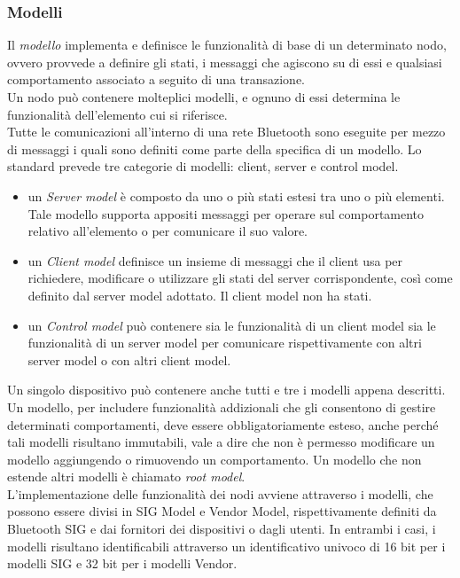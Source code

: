 \subsubsection{Modelli}
\label{subsub:modelli}
Il \textit{modello} implementa e definisce le funzionalità di base di un determinato nodo, ovvero provvede a definire gli stati, i messaggi che agiscono su di essi e qualsiasi comportamento associato a seguito di una transazione.\\
Un nodo può contenere molteplici modelli, e ognuno di essi determina le funzionalità dell'elemento cui si riferisce.\\
Tutte le comunicazioni all'interno di una rete Bluetooth sono eseguite per mezzo di messaggi i quali sono definiti come parte della specifica di un modello. Lo standard prevede tre categorie di modelli: client, server e control model.

\begin{itemize}
    \item un \textit{Server model} è composto da uno o più stati estesi tra uno o più elementi. Tale modello supporta appositi messaggi per operare sul comportamento relativo all'elemento o per comunicare il suo valore.
    
    \item un \textit{Client model} definisce un insieme di messaggi che il client usa per richiedere, modificare o utilizzare gli stati del server corrispondente, così come definito dal server model adottato. Il client model non ha stati.
    
    \item un \textit{Control model} può contenere sia le funzionalità di un client model sia le funzionalità di un server model per comunicare rispettivamente con altri server model o con altri client model.
\end{itemize}
Un singolo dispositivo può contenere anche tutti e tre i modelli appena descritti. 
Un modello, per includere funzionalità addizionali che gli consentono di gestire determinati comportamenti, deve essere obbligatoriamente esteso, anche perché tali modelli risultano immutabili, vale a dire che non è permesso modificare un modello aggiungendo o rimuovendo un comportamento.
Un modello che non estende altri modelli è chiamato \textit{root model}.\\
L'implementazione delle funzionalità dei nodi avviene attraverso i modelli, che possono essere divisi in SIG Model e Vendor Model, rispettivamente definiti da Bluetooth SIG e dai fornitori dei dispositivi o dagli utenti. In entrambi i casi, i modelli risultano identificabili attraverso un identificativo univoco di 16 bit per i modelli SIG e 32 bit per i modelli Vendor.

